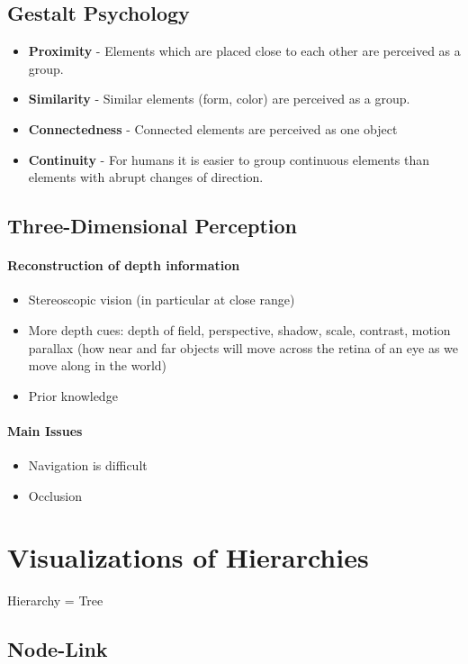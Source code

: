 \documentclass[10pt,a4paper]{article}
\begin{document}
	\subsection{Gestalt Psychology}
	\begin{itemize}
		\item \textbf{Proximity} - Elements which are placed close to each other are perceived as a group.
		\item \textbf{Similarity} - Similar elements (form, color) are perceived as a group.
		\item \textbf{Connectedness} - Connected elements are perceived as one object
		\item \textbf{Continuity} - For humans it is easier to group continuous elements than elements with abrupt changes of direction.
	\end{itemize}

	\subsection{Three-Dimensional Perception}
		\paragraph{Reconstruction of depth information}
		\begin{itemize}
			\item Stereoscopic vision (in particular at close range)
			\item More depth cues: depth of field, perspective, shadow, scale, contrast, motion parallax (how near and far objects will move across the retina of an eye as we move along in the world)
			\item Prior knowledge
		\end{itemize}
		\paragraph{Main Issues}
		\begin{itemize}
			\item Navigation is difficult
			\item Occlusion
		\end{itemize}
	
\section{Visualizations of Hierarchies}
	Hierarchy = Tree
	\subsection{Node-Link}
\end{document}
